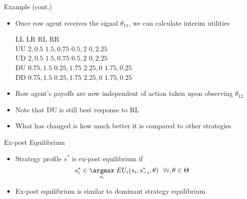 \documentclass[11pt,aspectratio=169]{beamer}
\begin{document}
  
  \begin{frame}{Example (cont.)}
   \begin{itemize}[<+->]
    \item Once row agent receives the signal $\theta_{11}$, we can calculate interim utilities
    \vspace{1em}
    \begin{center}\small
     \hspace{-4.9em}
     \begin{game}{4}{4}
      	\> LL			\> LR		\> RL		\> RR		\\
      UU	\> $2,0.5$		\> $1.5,0.75$	\> $0.5,2$	\> $0,2.25$	\\
      UD	\> $2,0.5$		\> $1.5,0.75$ 	\> $0.5,2$	\> $0,2.25$	\\
      DU	\> $0.75,1.5$	\> $0.25,1.75$	\> $2.25,0$	\> $1.75,0.25$	\\
      DD	\> $0.75,1.5$	\> $0.25,1.75$	\> $2.25,0$	\> $1.75,0.25$	\\
     \end{game}
    \end{center}
    \vspace{1em}
    \item Row agent's payoffs are now \alert{independent} of action taken upon observing $\theta_{12}$
    \item Note that DU is \alert{still best response} to RL
    \item What has changed is how much better it is compared to other strategies
   \end{itemize}
  \end{frame}


  \begin{frame}{Ex-post Equilibrium}
    \begin{itemize}[<+->]
    \setlength{\itemsep}{1.2em}
     \item Strategy profile $s^*$ is \alert{ex-post equilibrium} if
     $$s^*_i \in \underset{s_i}{\argmax} \; EU_i(s_i,s^*_{-i},\theta) ~~ \forall i, \theta \in \Theta$$
     \item Ex-post equilibrium is similar to \alert{dominant strategy equilibrium}
    \end{itemize}
  \end{frame}
  
\end{document}
